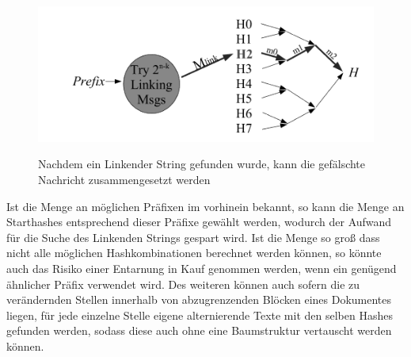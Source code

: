 \documentclass[a4paper,12pt,leqno]{article}
\begin{document}
\begin{figure}[h!]
\centering
\includegraphics[scale=0.6]{Grafiken/HerdingAttack2_Linking.png}
\label{png:herdinglinking}
\caption{Nachdem ein Linkender String gefunden wurde, kann die gefälschte Nachricht zusammengesetzt werden}
\end{figure}
Ist die Menge an möglichen Präfixen im vorhinein bekannt, so kann die Menge an Starthashes entsprechend dieser Präfixe gewählt werden, wodurch der Aufwand für die Suche des Linkenden Strings gespart wird. Ist die Menge so groß dass nicht alle möglichen Hashkombinationen berechnet werden können, so könnte auch das Risiko einer Entarnung in Kauf genommen werden, wenn ein genügend ähnlicher Präfix verwendet wird. Des weiteren können auch sofern die zu verändernden Stellen innerhalb von abzugrenzenden Blöcken eines Dokumentes liegen, für jede einzelne Stelle eigene alternierende Texte mit den selben Hashes gefunden werden, sodass diese auch ohne eine Baumstruktur vertauscht werden können.
\end{document}
